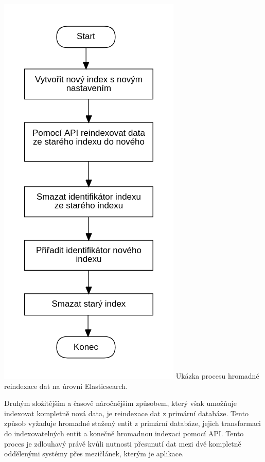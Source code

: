 		\includegraphics{obrazky/proces_reindexace_na_urovni_es}\hfill
		Ukázka procesu hromadné reindexace dat na úrovni Elasticsearch. %

		Druhým složitějším a časově náročnějším způsobem, který však umožňuje indexovat kompletně nová data, je
		reindexace dat z primární databáze.
		Tento způsob vyžaduje hromadné stažený entit z primární databáze, jejich transformaci do indexovatelných entit
		a konečně hromadnou indexaci pomocí \ac{API}.
		Tento proces je zdlouhavý právě kvůli nutnosti přesunutí dat mezi dvě kompletně oddělenými systémy přes mezičlánek,
		kterým je aplikace.

